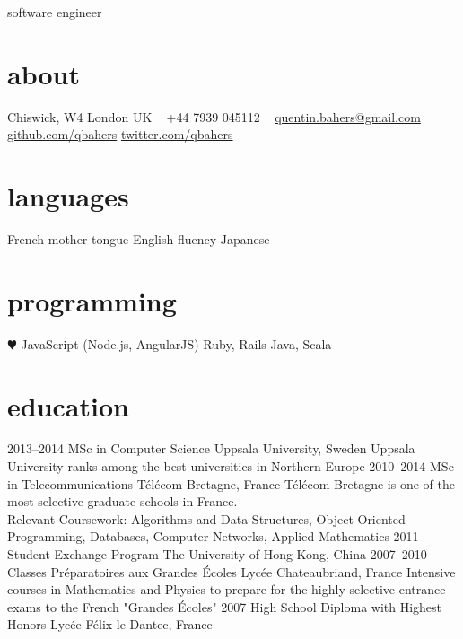 \documentclass[]{friggeri-cv}
\begin{document}
       {software engineer}


\begin{aside}
  \section{about}
    Chiswick, W4
    London
    UK
    ~
    +44 7939 045112
    ~
    \href{mailto:quentin.bahers@gmail.com}{quentin.bahers@gmail.com}
    \href{http://github.com/qbahers}{github.com/qbahers}
    \href{http://twitter.com/qbahers}{twitter.com/qbahers}
  \section{languages}
    French mother tongue
    English fluency
    Japanese
  \section{programming}
    {\color{red} $\varheartsuit$} JavaScript
    (Node.js, AngularJS)
    Ruby, Rails
    Java, Scala
\end{aside}



\section{education}

\begin{entrylist}
  \entry
    {2013–2014}
    {MSc in Computer Science}
    {Uppsala University, Sweden}
    {Uppsala University ranks among the best universities in Northern Europe}
  \entry
    {2010–2014}
    {MSc in Telecommunications}
    {Télécom Bretagne, France}
    {Télécom Bretagne is one of the most selective graduate schools in France.
    \\ Relevant Coursework: Algorithms and Data Structures, Object-Oriented Programming, Databases, Computer Networks, Applied Mathematics}
  \entry
    {2011}
    {Student Exchange Program}
    {The University of Hong Kong, China}
    {}
  \entry
    {2007–2010}
    {Classes Préparatoires aux Grandes Écoles}
    {Lycée Chateaubriand, France}
    {Intensive courses in Mathematics and Physics to prepare for the highly selective entrance exams to the French "Grandes Écoles"}
  \entry
    {2007}
    {High School Diploma with Highest Honors}
    {Lycée Félix le Dantec, France}
    {}
\end{entrylist}
\end{document}
